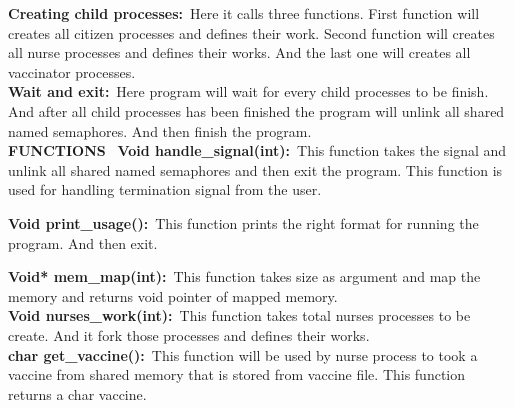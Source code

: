 \documentclass[a4 paper]{article}
\begin{document}
\textbf{Creating child processes:}\newline\
\phantom{beta}Here it calls three functions. First function will creates all  citizen processes and defines their work. Second function will creates all nurse processes and defines their works. And the last one will creates all vaccinator processes.\newline\\


\textbf{Wait and exit:}\newline\
\phantom{beta}Here program will wait for every child processes to be finish. And after all child processes has been finished the program will unlink all shared named semaphores. And then finish the program.\newline\\

\textbf{\large FUNCTIONS}\newline\
\newline
\textbf{Void handle\_signal(int):}\newline\
\phantom{beta}This function takes the signal and unlink all shared named semaphores and then exit the program. This function is used for handling termination signal from the user.\newline\

\textbf{Void print\_usage():}\newline\
\phantom{beta}This function prints the right format for running the program. And then exit.\newline\

\textbf{Void* mem\_map(int):}\newline\
\phantom{beta}This function takes size as argument and map the memory and returns void pointer of mapped memory.\newline\\

\textbf{Void nurses\_work(int):}\newline\
\phantom{beta}This function takes total nurses processes to be create. And it fork those processes and defines their works.\newline\\

\textbf{char get\_vaccine():}\newline\
\phantom{beta}This function will be used by nurse process to took a vaccine from shared memory that is stored from vaccine file. This function returns a char vaccine.\newline\\
\end{document}
